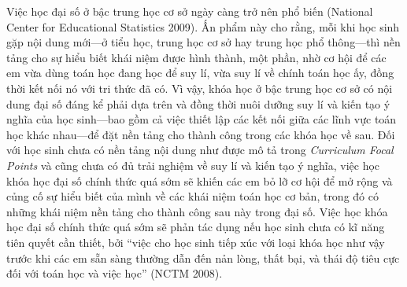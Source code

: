 {{    Việc học đại số ở bậc trung học cơ sở ngày càng trở nên phổ biến (National Center for Educational Statistics 2009). Ấn phẩm này cho rằng, mỗi khi học sinh gặp nội dung mới---ở tiểu học, trung học cơ sở hay trung học phổ thông---thì nền tảng cho sự hiểu biết khái niệm được hình thành, một phần, nhờ cơ hội để các em vừa dùng toán học đang học để suy lí, vừa suy lí về chính toán học ấy, đồng thời kết nối nó với tri thức đã có. Vì vậy, khóa học ở bậc trung học cơ sở có nội dung đại số đáng kể phải dựa trên và đồng thời nuôi dưỡng suy lí và kiến tạo ý nghĩa của học sinh---bao gồm cả việc thiết lập các kết nối giữa các lĩnh vực toán học khác nhau---để đặt nền tảng cho thành công trong các khóa học về sau. Đối với học sinh chưa có nền tảng nội dung như được mô tả trong \emph{Curriculum Focal Points} và cũng chưa có đủ trải nghiệm về suy lí và kiến tạo ý nghĩa, việc học khóa học đại số chính thức quá sớm sẽ khiến các em bỏ lỡ cơ hội để mở rộng và củng cố sự hiểu biết của mình về các khái niệm toán học cơ bản, trong đó có những khái niệm nền tảng cho thành công sau này trong đại số. Việc học khóa học đại số chính thức quá sớm sẽ phản tác dụng nếu học sinh chưa có kĩ năng tiên quyết cần thiết, bởi ``việc cho học sinh tiếp xúc với loại khóa học như vậy trước khi các em sẵn sàng thường dẫn đến nản lòng, thất bại, và thái độ tiêu cực đối với toán học và việc học'' (NCTM 2008).}
  }{\NOTE{}}

